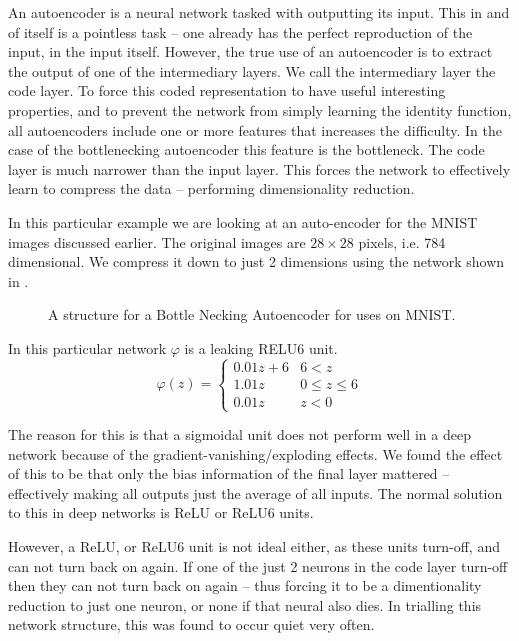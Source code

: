 \documentclass[12pt,parskip]{komatufte}
\begin{document}
An autoencoder is a neural network tasked with outputting its input.
This in and of itself is a pointless task -- one already has the perfect reproduction of the input, in the input itself.
However, the true use of an autoencoder is to extract the output of one of the intermediary layers.
We call the intermediary layer the code layer.
To force this coded representation to have useful interesting properties,
and to prevent the network from simply learning the identity function,
all autoencoders include one or more features that increases the difficulty.
In the case of the bottlenecking autoencoder this feature is the bottleneck.
The code layer is much narrower than the input layer.
This forces the network to effectively learn to compress the data -- performing dimensionality reduction.

In this particular example we are looking at an auto-encoder for the MNIST images discussed earlier.
The original images are $28 \times 28$ pixels, i.e. 784 dimensional.
We compress it down to just 2 dimensions using the network shown in .

\begin{figure}
	\caption{A structure for a Bottle Necking Autoencoder for uses on MNIST.}
	\label{fig-autoencoder}
	
\end{figure}


In this particular network $\varphi$ is a leaking RELU6 unit.
\begin{equation}
\varphi(z)=\begin{cases}
    0.01z+6 & 6<z \\
	1.01z & 0 \le z \le 6 \\
	0.01z & z < 0
\end{cases}
\end{equation}

The reason for this is that a sigmoidal unit does not perform well in a deep network because of the gradient-vanishing/exploding effects.
We found the effect of this to be that only the bias information of the final layer mattered -- effectively making all outputs just the average of all inputs.
The normal solution to this in deep networks is ReLU or ReLU6 units.

However, a ReLU, or ReLU6 unit is not ideal either,
as these units turn-off, and can not turn back on again.
If one of the just 2 neurons in the code layer turn-off then they can not turn back on again -- thus forcing it to be a dimentionality reduction to just one neuron, or none if that neural also dies.
In trialling this network structure, this was found to occur quiet very often.
\end{document}
